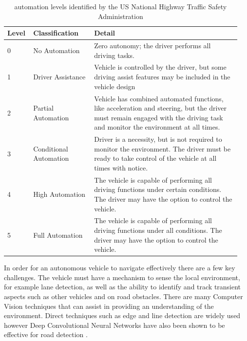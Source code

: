 \documentclass[]{aiaa-tc}%
\begin{document}
\begin{table}%
 \begin{center}
  \caption{automation levels identified by the US National Highway Traffic Safety Administration \citep{automationVisionForSafety}}
  \label{t:automationLevels}
  \begin{tabular}{p{0.1\linewidth}p{0.25\linewidth}p{0.6\linewidth}}
       Level & Classification & Detail\\\hline
        0 &  No Automation & Zero autonomy; the driver performs all driving tasks. \\
       1 &  Driver Assistance & Vehicle is controlled by the driver, but some driving assist features may be included in the vehicle design \\
       2 &  Partial Automation & Vehicle has combined automated functions, like acceleration and steering, but the driver must remain engaged with the driving task and monitor the environment at all times. \\
       3 &  Conditional Automation &   Driver is a necessity, but is not required to monitor the environment. The driver must be ready to take control of the vehicle at all times with notice. \\
      4 &  High Automation &   The vehicle is capable of performing all driving functions under certain conditions. The driver may have the option to control the vehicle. \\
      5 &   Full Automation &   The vehicle is capable of performing all driving functions under all conditions. The driver may have the option to control the vehicle. 
  \end{tabular}
 \end{center}
\end{table}

In order for an autonomous vehicle to navigate effectively there are a few key challenges. The vehicle must have a mechanism to sense the local environment, for example lane detection, as well as the ability to identify and track transient aspects such as other vehicles and on road obstacles. There are many Computer Vision techniques that can assist in providing an understanding of the environment. Direct techniques such as edge and line detection are widely used however Deep Convolutional Neural Networks have also been shown to be effective for road detection \citep{deepRoadSegmentation}.
\end{document}
